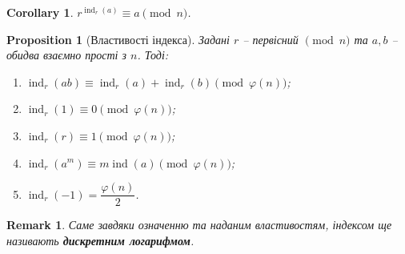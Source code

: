 \documentclass[a4paper, 10pt]{article}
\theoremstyle{theoremdd}
\theoremstyle{theoremdd}
\theoremstyle{theoremdd}
\theoremstyle{theoremdd}
\theoremstyle{theoremdd}
\newtheorem{proposition}[theorem]{Proposition}
\theoremstyle{theoremdd}
\newtheorem{remark}[theorem]{Remark}
\theoremstyle{theoremdd}
\theoremstyle{theoremdd}
\newtheorem{corollary}[theorem]{Corollary}
\DeclareMathOperator{\ind}{ind}
\begin{document}
\begin{corollary}
$r^{\ind_r(a)} \equiv a \pmod n$.
\end{corollary}

\begin{proposition}[Властивості індекса]
Задані $r$ -- первісний $\!\! \pmod n$ та $a,b$ -- обидва взаємно прості з $n$. Тоді:
\begin{enumerate}[nosep,wide=0pt,label={\arabic*)}]
\item $\ind_r(ab) \equiv \ind_r(a) + \ind_r(b) \pmod {\varphi(n)}$;
\item $\ind_r (1) \equiv 0 \pmod {\varphi(n)}$;
\item $\ind_r (r) \equiv 1 \pmod {\varphi(n)}$;
\item $\ind_r (a^m) \equiv m \ind (a) \pmod {\varphi(n)}$;
\item $\ind_r(-1) = \dfrac{\varphi(n)}{2}$.
\end{enumerate}
\end{proposition}

\begin{remark}
Саме завдяки означенню та наданим властивостям, індексом ще називають \textbf{дискретним логарифмом}.
\end{remark}
\end{document}
